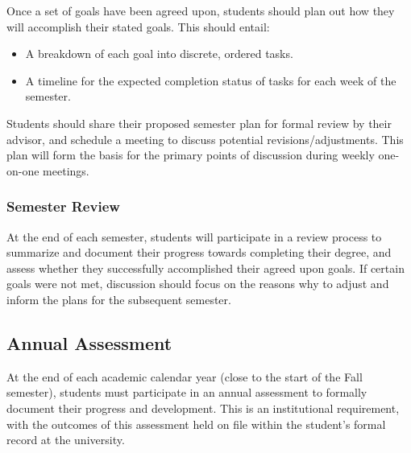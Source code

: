 \documentclass[12pt,a4paper,article,oneside]{memoir} %
\begin{document}
Once a set of goals have been agreed upon, students should plan out how they will accomplish their stated goals. This should entail:
\begin{itemize}
\item A breakdown of each goal into discrete, ordered tasks.
\item A timeline for the expected completion status of tasks for each week of the semester.
\end{itemize}
Students should share their proposed semester plan for formal review by their advisor, and schedule a meeting to discuss potential revisions/adjustments. This plan will form the basis for the primary points of discussion during weekly one-on-one meetings.

\subsubsection{Semester Review}

At the end of each semester, students will participate in a review process to summarize and document their progress towards completing their degree, and assess whether they successfully accomplished their agreed upon goals. If certain goals were not met, discussion should focus on the reasons why to adjust and inform the plans for the subsequent semester.

\subsection{Annual Assessment}

At the end of each academic calendar year (close to the start of the Fall semester), students must participate in an annual assessment to formally document their progress and development. This is an institutional requirement, with the outcomes of this assessment held on file within the student's formal record at the university.
\end{document}
